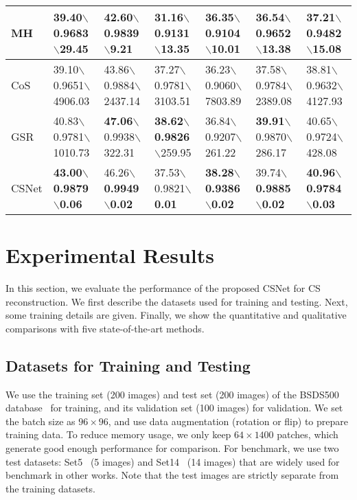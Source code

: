 \documentclass[5pt]{article}
\begin{document}
\begin{table*}[t]
\begin{tabular}{|l|l|l|l|l|l|l|}
\hline 
MH & 39.40$\backslash$0.9683$\backslash$29.45 & 42.60$\backslash$0.9839$\backslash$9.21 & 31.16$\backslash$0.9131$\backslash$13.35 & 36.35$\backslash$0.9104$\backslash$10.01 & 36.54$\backslash$0.9652$\backslash$13.38 & 37.21$\backslash$0.9482$\backslash$15.08\\ 
\hline 
CoS & 39.10$\backslash$0.9651$\backslash$\tiny 4906.03 & 43.86$\backslash$0.9884$\backslash$\tiny 2437.14 & 37.27$\backslash$0.9781$\backslash$\tiny 3103.51 & 36.23$\backslash$0.9060$\backslash$\tiny 7803.89 & 37.58$\backslash$0.9784$\backslash$\tiny 2389.08 & 38.81$\backslash$0.9632$\backslash$\tiny 4127.93\\ 
\hline 
GSR & 40.83$\backslash$0.9781$\backslash$\tiny 1010.73 & \textbf{47.06}$\backslash$0.9938$\backslash$322.31 & \textbf{38.62}$\backslash$\textbf{0.9826}$\backslash$259.95 & 36.84$\backslash$0.9207$\backslash$261.22 & \textbf{39.91}$\backslash$0.9870$\backslash$286.17 & 40.65$\backslash$0.9724$\backslash$428.08\\ 
\hline 
CSNet & \textbf{43.00}$\backslash$\textbf{0.9879}$\backslash$\textbf{0.06} & 46.26$\backslash$\textbf{0.9949}$\backslash$\textbf{0.02} & 37.53$\backslash$0.9821$\backslash$\textbf{0.01} & \textbf{38.28}$\backslash$\textbf{0.9386}$\backslash$\textbf{0.02} & 39.74$\backslash$\textbf{0.9885}$\backslash$\textbf{0.02} & \textbf{40.96}$\backslash$\textbf{0.9784}$\backslash$\textbf{0.03}\\\hline 
\end{tabular} 
\vspace{-15pt}
\end{table*}

\section{Experimental Results}

In this section, we evaluate the performance of the proposed CSNet for CS reconstruction. We first describe the datasets used for training and testing. Next, some training details are given. Finally, we show the quantitative and qualitative comparisons with five state-of-the-art methods.

\subsection{Datasets for Training and Testing}

We use the training set (200 images) and test set (200 images) of the BSDS500 database~\cite{rf22} for training, and its validation set (100 images) for validation. We set the batch size as $96 \times 96$, and use data augmentation (rotation or flip) to prepare training data. To reduce memory usage, we only keep $64 \times 1400$ patches, which generate good enough performance for comparison. For benchmark, we use two test datasets: Set5~\cite{rf23} (5 images) and Set14~\cite{rf24} (14 images) that are widely used for benchmark in other works. Note that the test images are strictly separate from the training datasets.
\end{document}
